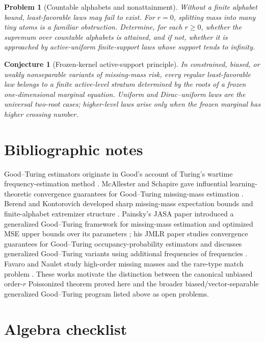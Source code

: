 \documentclass[11pt]{article}
\newtheorem{conjecture}[theorem]{Conjecture}
\newtheorem{problem}[theorem]{Problem}
\theoremstyle{definition}
\begin{document}
\begin{problem}[Countable alphabets and nonattainment]
Without a finite alphabet bound, least-favorable laws may fail to exist.  For $r=0$, splitting mass into many tiny atoms is a familiar obstruction.  Determine, for each $r\ge0$, whether the supremum over countable alphabets is attained, and if not, whether it is approached by active-uniform finite-support laws whose support tends to infinity.
\end{problem}

\begin{conjecture}[Frozen-kernel active-support principle]
In constrained, biased, or weakly nonseparable variants of missing-mass risk, every regular least-favorable law belongs to a finite active-level stratum determined by the roots of a frozen one-dimensional marginal equation.  Uniform and Dirac--uniform laws are the universal two-root cases; higher-level laws arise only when the frozen marginal has higher crossing number.
\end{conjecture}

\section{Bibliographic notes}

Good--Turing estimators originate in Good's account of Turing's wartime frequency-estimation method \cite{Good1953}.  McAllester and Schapire gave influential learning-theoretic convergence guarantees for Good--Turing missing-mass estimation \cite{McAllesterSchapire2000}.  Berend and Kontorovich developed sharp missing-mass expectation bounds and finite-alphabet extremizer structure \cite{BerendKontorovich2012}.  Painsky's JASA paper introduced a generalized Good--Turing framework for missing-mass estimation and optimized MSE upper bounds over its parameters \cite{Painsky2023}; his JMLR paper studies convergence guarantees for Good--Turing occupancy-probability estimators and discusses generalized Good--Turing variants using additional frequencies of frequencies \cite{Painsky2022}.  Favaro and Naulet study high-order missing masses and the rare-type match problem \cite{FavaroNaulet2023}.  These works motivate the distinction between the canonical unbiased order-$r$ Poissonized theorem proved here and the broader biased/vector-separable generalized Good--Turing program listed above as open problems.

\appendix

\section{Algebra checklist}
\end{document}
